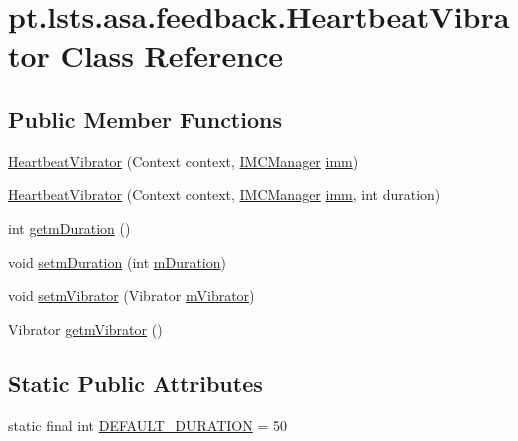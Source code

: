 \hypertarget{classpt_1_1lsts_1_1asa_1_1feedback_1_1HeartbeatVibrator}{}\section{pt.\+lsts.\+asa.\+feedback.\+Heartbeat\+Vibrator Class Reference}
\label{classpt_1_1lsts_1_1asa_1_1feedback_1_1HeartbeatVibrator}
\subsection*{Public Member Functions}
\begin{DoxyCompactItemize}
\item 
\hyperlink{classpt_1_1lsts_1_1asa_1_1feedback_1_1HeartbeatVibrator_abf53e64287636807ea151d9f1d071204}{Heartbeat\+Vibrator} (Context context, \hyperlink{classpt_1_1lsts_1_1asa_1_1managers_1_1IMCManager}{I\+M\+C\+Manager} \hyperlink{classpt_1_1lsts_1_1asa_1_1feedback_1_1HeartbeatVibrator_a2a329113447103743dacd656ae38963f}{imm})
\item 
\hyperlink{classpt_1_1lsts_1_1asa_1_1feedback_1_1HeartbeatVibrator_ac317fb116cc76a27b25b7a29dbe3fb7d}{Heartbeat\+Vibrator} (Context context, \hyperlink{classpt_1_1lsts_1_1asa_1_1managers_1_1IMCManager}{I\+M\+C\+Manager} \hyperlink{classpt_1_1lsts_1_1asa_1_1feedback_1_1HeartbeatVibrator_a2a329113447103743dacd656ae38963f}{imm}, int duration)
\item 
int \hyperlink{classpt_1_1lsts_1_1asa_1_1feedback_1_1HeartbeatVibrator_a0eeff3fb6da5b00dafaefc6925bef6b9}{getm\+Duration} ()
\item 
void \hyperlink{classpt_1_1lsts_1_1asa_1_1feedback_1_1HeartbeatVibrator_a7da93098bd5e1bf4ef9d9c81ef5452e0}{setm\+Duration} (int \hyperlink{classpt_1_1lsts_1_1asa_1_1feedback_1_1HeartbeatVibrator_abba287258134a26d6739c0adb62c5f1d}{m\+Duration})
\item 
void \hyperlink{classpt_1_1lsts_1_1asa_1_1feedback_1_1HeartbeatVibrator_a02ed445dd0498b2abcbf6c0dad5e7bd0}{setm\+Vibrator} (Vibrator \hyperlink{classpt_1_1lsts_1_1asa_1_1feedback_1_1HeartbeatVibrator_a4482c3c6c9095b1103daa19bbc3a0fcd}{m\+Vibrator})
\item 
Vibrator \hyperlink{classpt_1_1lsts_1_1asa_1_1feedback_1_1HeartbeatVibrator_a78cfbe7cf03a261a552587ca6372fe31}{getm\+Vibrator} ()
\end{DoxyCompactItemize}
\subsection*{Static Public Attributes}
\begin{DoxyCompactItemize}
\item 
static final int \hyperlink{classpt_1_1lsts_1_1asa_1_1feedback_1_1HeartbeatVibrator_ac43ba8fec3eac50f3f39bc1e9a62bc55}{D\+E\+F\+A\+U\+L\+T\+\_\+\+D\+U\+R\+A\+T\+I\+O\+N} = 50
\end{DoxyCompactItemize}
